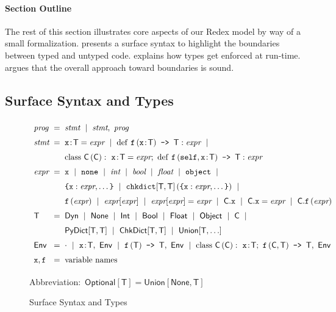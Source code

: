 \documentclass[english,cleveref,submission]{programming}
\makeatletter
\newcommand{\code}[1]{\texttt{#1}}
\newcommand{\defeq}{=}
\newcommand{\langmid}{~\mid~} %
\newenvironment{langarray}{\(\def\arraystretch{1.5}\begin{array}{l@{\hspace{2mm}}c@{\hspace{2mm}}l}}{\end{array}\)}
\newcommand{\spapp}[2]{#1\,(#2)}
\newcommand{\spann}[2]{#1\!:\!#2}
\newcommand{\typefont}[1]{\mathsf{#1}}
\newcommand{\codefont}[1]{\emph{#1}}
\newcommand{\paramtype}[2]{#1[#2]}
\newcommand{\sptype}{\typefont{T}}
\newcommand{\sptclass}{\typefont{C}}
\newcommand{\sptint}{\typefont{Int}}
\newcommand{\sptbool}{\typefont{Bool}}
\newcommand{\sptfloat}{\typefont{Float}}
\newcommand{\sptdyn}{\typefont{Dyn}}
\newcommand{\sptobject}{\typefont{Object}}
\newcommand{\sptnone}{\typefont{None}}
\newcommand{\sptoptional}[1]{\paramtype{\typefont{Optional}}{#1}}
\newcommand{\sptunion}[1]{\paramtype{\typefont{Union}}{#1}}
\newcommand{\sptrawpydict}{\typefont{PyDict}}
\newcommand{\sptpydict}[2]{\paramtype{\sptrawpydict}{#1, #2}}
\newcommand{\sptchkdict}[2]{\paramtype{\typefont{ChkDict}}{#1, #2}}
\newcommand{\sptenv}{\typefont{Env}}
\newcommand{\sptenvnil}{\cdot}
\newcommand{\sptvardef}[2]{\spann{#1}{#2}}
\newcommand{\sptfundef}[3]{\spapp{#1}{#2}\code{ -> }#3}
\newcommand{\sptclassdef}[4]{\mathrm{class}~\spapp{#1}{#2}:~#3;~#4}
\newcommand{\spx}{\code{x}}
\newcommand{\spf}{\code{f}}
\newcommand{\spc}{\sptclass}
\newcommand{\spprog}{\codefont{prog}}
\newcommand{\spstmt}{\codefont{stmt}}
\newcommand{\spexpr}{\codefont{expr}}
\newcommand{\spvardef}[3]{\sptvardef{#1}{#2} = #3}
\newcommand{\spfundef}[4]{\mathrm{def}~\spapp{#1}{#2}\code{ -> }#3: #4}
\newcommand{\spclassdef}[4]{\mathrm{class}~\spapp{#1}{#2}:~#3;~#4}
\newcommand{\spself}{\code{self}}
\newcommand{\spobject}{\code{object}}
\newcommand{\spnone}{\code{none}}
\newcommand{\spint}{\codefont{int}}
\newcommand{\spbool}{\codefont{bool}}
\newcommand{\spfloat}{\codefont{float}}
\newcommand{\sppydict}[1]{\code{\{}#1\code{\}}}
\newcommand{\spchkdict}[3]{\spapp{\paramtype{\code{chkdict}}{#1, #2}}{#3}}
\newcommand{\spdictref}[2]{#1[#2]}
\newcommand{\spdictset}[3]{\spdictref{#1}{#2} = #3}
\newcommand{\spobjref}[2]{#1.#2}
\newcommand{\spobjset}[3]{\spobjref{#1}{#2} = #3}
\newcommand{\spobjapp}[3]{\spobjref{#1}{\spapp{#2}{#3}}}
\makeatother
\begin{document}
\paragraph{Section Outline}

The rest of this section illustrates core aspects of our Redex model by way of
a small formalization.
 presents a surface syntax to highlight the boundaries between
typed and untyped code.
 explains how types get enforced at run-time.
 argues that the overall approach toward boundaries is sound.


\subsection{Surface Syntax and Types}
\label{s:surface}

\begin{figure}[t]
  \begin{langarray}
    \spprog & \defeq &
      \spstmt \langmid \spstmt,~\spprog
  \\
    \spstmt & \defeq &
      \spvardef{\spx}{\sptype}{\spexpr} \langmid
      \spfundef{\spf}{\spann{\spx}{\sptype}}{\sptype}{\spexpr} \langmid
  \\ & &
      \spclassdef{\spc}{\spc}{\spvardef{\spx}{\sptype}{\spexpr}}{\spfundef{\spf}{\spself, \spann{\spx}{\sptype}}{\sptype}{\spexpr}}
  \\
    \spexpr & \defeq &
      \spx \langmid \spnone \langmid \spint \langmid \spbool \langmid \spfloat \langmid \spobject \langmid
  \\ & &
      \sppydict{\spx: \spexpr, \ldots} \langmid
      \spchkdict{\sptype}{\sptype}{\sppydict{\spx: \spexpr, \ldots}} \langmid
  \\ & &
      \spapp{\spf}{\spexpr} \langmid
      \spdictref{\spexpr}{\spexpr} \langmid
      \spdictset{\spexpr}{\spexpr}{\spexpr} \langmid
      \spobjref{\spc}{\spx} \langmid
      \spobjset{\spc}{\spx}{\spexpr} \langmid
      \spobjapp{\spc}{\spf}{\spexpr}
  \\
    \sptype & \defeq &
      \sptdyn \langmid
      \sptnone \langmid
      \sptint \langmid
      \sptbool \langmid
      \sptfloat \langmid
      \sptobject \langmid
      \sptclass \langmid
  \\ & &
      \sptpydict{\sptype}{\sptype} \langmid
      \sptchkdict{\sptype}{\sptype} \langmid
      \sptunion{\sptype, \ldots}
  \\
    \sptenv & \defeq &
      \sptenvnil \langmid
      \sptvardef{\spx}{\sptype},~\sptenv \langmid
      \sptfundef{\spf}{\sptype}{\sptype},~\sptenv \langmid
      \sptclassdef{\spc}{\spc}{\sptvardef{\spx}{\sptype}}{\sptfundef{\spf}{\sptclass, \sptype}{\sptype}},~\sptenv
  \\
    \spx, \spf & \defeq & \mbox{variable names}
  \end{langarray}

  \bigskip
  \mbox{Abbreviation: $\sptoptional{\sptype} \defeq \sptunion{\sptnone, \sptype}$}

  \caption{Surface Syntax and Types}
  \label{f:surface-types}
\end{figure}
\end{document}
